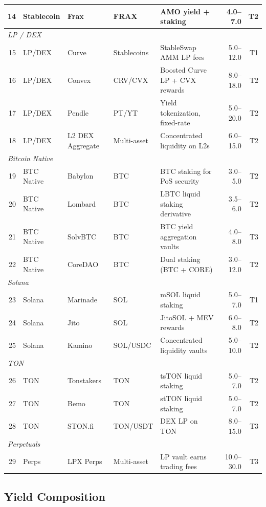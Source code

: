 \documentclass[11pt,twocolumn]{article}
\begin{document}
\begin{table}[t]
\begin{tabular}{@{}rllllrr@{}}
14 & Stablecoin & Frax & FRAX & AMO yield + staking & 4.0--7.0 & T2 \\
\midrule
\multicolumn{7}{l}{\textit{LP / DEX}} \\
15 & LP/DEX & Curve & Stablecoins & StableSwap AMM LP fees & 5.0--12.0 & T1 \\
16 & LP/DEX & Convex & CRV/CVX & Boosted Curve LP + CVX rewards & 8.0--18.0 & T2 \\
17 & LP/DEX & Pendle & PT/YT & Yield tokenization, fixed-rate & 5.0--20.0 & T2 \\
18 & LP/DEX & L2 DEX Aggregate & Multi-asset & Concentrated liquidity on L2s & 6.0--15.0 & T2 \\
\midrule
\multicolumn{7}{l}{\textit{Bitcoin Native}} \\
19 & BTC Native & Babylon & BTC & BTC staking for PoS security & 3.0--5.0 & T2 \\
20 & BTC Native & Lombard & BTC & LBTC liquid staking derivative & 3.5--6.0 & T2 \\
21 & BTC Native & SolvBTC & BTC & BTC yield aggregation vaults & 4.0--8.0 & T3 \\
22 & BTC Native & CoreDAO & BTC & Dual staking (BTC + CORE) & 3.0--12.0 & T2 \\
\midrule
\multicolumn{7}{l}{\textit{Solana}} \\
23 & Solana & Marinade & SOL & mSOL liquid staking & 5.0--7.0 & T1 \\
24 & Solana & Jito & SOL & JitoSOL + MEV rewards & 6.0--8.0 & T2 \\
25 & Solana & Kamino & SOL/USDC & Concentrated liquidity vaults & 5.0--10.0 & T2 \\
\midrule
\multicolumn{7}{l}{\textit{TON}} \\
26 & TON & Tonstakers & TON & tsTON liquid staking & 5.0--7.0 & T2 \\
27 & TON & Bemo & TON & stTON liquid staking & 5.0--7.0 & T2 \\
28 & TON & STON.fi & TON/USDT & DEX LP on TON & 8.0--15.0 & T3 \\
\midrule
\multicolumn{7}{l}{\textit{Perpetuals}} \\
29 & Perps & LPX Perps & Multi-asset & LP vault earns trading fees & 10.0--30.0 & T3 \\
\bottomrule
\end{tabular}
\end{table}

\subsection{Yield Composition}\label{sec:composition}
\end{document}

